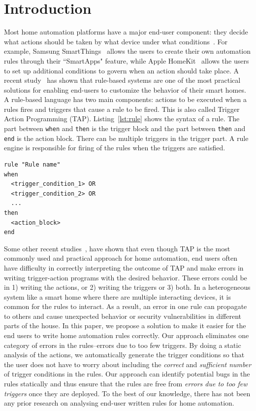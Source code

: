 \documentclass{sig-alternate-05-2015}
\begin{document}
\section{Introduction}
Most home automation platforms have a major end-user component: they decide what actions should be taken by what device under what conditions~\cite{Newmannowwere}. For example, Samsung SmartThings~\cite{samsung} allows the users to create their own automation rules through their ``SmartApps" feature, while Apple HomeKit~\cite{homekit} allows the users to set up additional conditions to govern when an action should take place. A recent study~\cite{practical-tap} has shown that rule-based systems are one of the most practical solutions for enabling end-users to customize the behavior of their smart homes. A rule-based language has two main components: actions to be executed when a rules fires and triggers that cause a rule to be fired. This is also called Trigger Action Programming (TAP). Listing~\ref{lst:rule} shows the syntax of a rule. The part between \texttt{when} and \texttt{then} is the trigger block and the part between \texttt{then} and \texttt{end} is the action block. There can be multiple triggers in the trigger part. A rule engine is responsible for firing of the rules when the triggers are satisfied.
\begin{lstlisting}[caption={Syntax of rules.},label={lst:rule}]
rule "Rule name"
when
  <trigger_condition_1> OR
  <trigger_condition_2> OR 
  ...	
then
  <action_block>
end
\end{lstlisting}
Some other recent studies~\cite{Huang},\cite{wild-tap} have shown that even though TAP is the most commonly used and practical approach for home automation, end users often have difficulty in correctly interpreting the outcome of TAP and make errors in writing trigger-action programs with the desired behavior. These errors could be in 1) writing the actions, or 2) writing the triggers or 3) both. In a heterogeneous system like a smart home where there are multiple interacting devices, it is common for the rules to interact. As a result, an error in one rule can propagate to others and cause unexpected behavior or security vulnerabilities in different parts of the house. In this paper, we propose a solution to make it easier for the end users to write home automation rules correctly. Our approach eliminates one category of errors in the rules--errors due to too few triggers. By doing a static analysis of the actions, we automatically generate the trigger conditions so that the user does not have to worry about including the \textit{correct} and \textit{sufficient number} of trigger conditions in the rules. Our approach can identify potential bugs in the rules statically and thus ensure that the rules are free from \textit{errors due to too few triggers} once they are deployed. To the best of our knowledge, there has not been any prior research on analysing end-user written rules for home automation.
\end{document}

